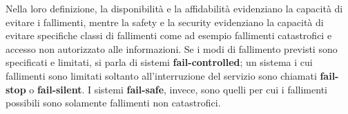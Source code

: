 \documentclass[14pt]{extarticle}
\begin{document}
Nella loro definizione, la disponibilità e la affidabilità evidenziano la
capacità di evitare i fallimenti, mentre la safety e la security evidenziano la
capacità di evitare specifiche classi di fallimenti come ad esempio fallimenti
catastrofici e accesso non autorizzato alle informazioni.
Se i modi di fallimento previsti sono specificati e limitati, si parla di sistemi \textbf{fail-controlled}; un
sistema i cui fallimenti sono limitati soltanto all'interruzione del servizio sono
chiamati \textbf{fail-stop} o \textbf{fail-silent}. I sistemi \textbf{fail-safe}, invece, sono quelli per cui i
fallimenti possibili sono solamente fallimenti non catastrofici.

\end{document}
